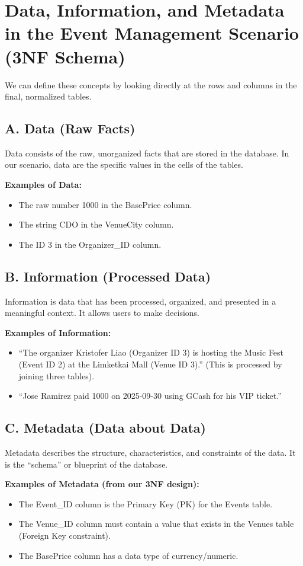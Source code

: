 \documentclass[12pt]{article}
\begin{document}
\section*{Data, Information, and Metadata in the Event Management Scenario (3NF Schema)}

We can define these concepts by looking directly at the rows and columns in the final, normalized tables.

\subsection*{A. Data (Raw Facts)}
Data consists of the raw, unorganized facts that are stored in the database. In our scenario, data are the specific values in the cells of the tables.

\textbf{Examples of Data:}
\begin{itemize}[noitemsep]
    \item The raw number 1000 in the BasePrice column.
    \item The string CDO in the VenueCity column.
    \item The ID 3 in the Organizer\_ID column.
\end{itemize}

\subsection*{B. Information (Processed Data)}
Information is data that has been processed, organized, and presented in a meaningful context. It allows users to make decisions.

\textbf{Examples of Information:}
\begin{itemize}[noitemsep]
    \item ``The organizer Kristofer Liao (Organizer ID 3) is hosting the Music Fest (Event ID 2) at the Limketkai Mall (Venue ID 3).'' (This is processed by joining three tables).
    \item ``Jose Ramirez paid 1000 on 2025-09-30 using GCash for his VIP ticket.''
\end{itemize}

\subsection*{C. Metadata (Data about Data)}
Metadata describes the structure, characteristics, and constraints of the data. It is the ``schema'' or blueprint of the database.

\textbf{Examples of Metadata (from our 3NF design):}
\begin{itemize}[noitemsep]
    \item The Event\_ID column is the Primary Key (PK) for the Events table.
    \item The Venue\_ID column must contain a value that exists in the Venues table (Foreign Key constraint).
    \item The BasePrice column has a data type of currency/numeric.
\end{itemize}
\end{document}

